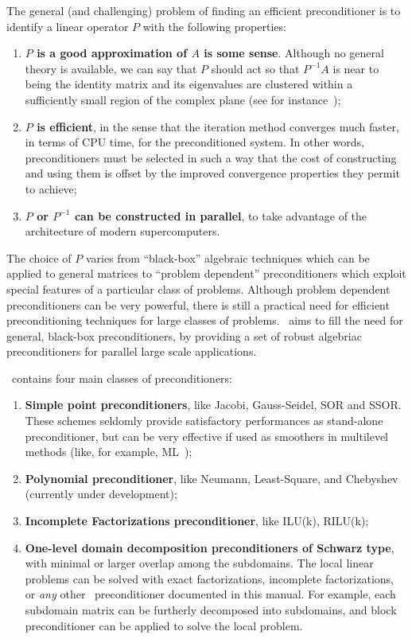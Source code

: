 The general (and challenging) problem of finding an efficient
preconditioner is to identify a linear operator $P$ with the following
properties:
\begin{enumerate}
\item {\bf $P$ is a good approximation of $A$ is some sense}. Although no
  general theory is available, we can say that $P$ should act so that
  $P^{-1} A$ is near to being the identity matrix and its eigenvalues
  are clustered within a sufficiently small region of the complex plane 
  (see for instance~\cite{greenbaum97iterative});
\item {\bf $P$ is efficient}, in the sense that the iteration method converges
  much faster, in terms of CPU time, for the preconditioned system.  In
  other words, preconditioners must be selected in such a way that the
  cost of constructing and using them is offset by the improved
  convergence properties they permit to achieve;
\item {\bf $P$ or $P^{-1}$ can be constructed in parallel}, to take advantage of the architecture of modern supercomputers.
\end{enumerate}

The choice of $P$ varies from ``black-box'' algebraic techniques which
can be applied to general matrices to ``problem dependent''
preconditioners which exploit special features of a particular class
of problems. Although problem dependent preconditioners can be very
powerful, there is still a practical need for efficient
preconditioning techniques for large classes of problems. \ifpack\ aims to
fill the need for general, black-box preconditioners, by providing a set of
robust algebriac preconditioners for parallel large scale applications.

\ifpack\ contains four main classes of preconditioners:
\begin{enumerate}
\item {\bf Simple point preconditioners}, 
  like Jacobi, Gauss-Seidel, SOR and SSOR.
  These schemes seldomly provide satisfactory performances as stand-alone
  preconditioner, but can be very effective if used as smoothers in
  multilevel methods (like, for example, ML~\cite{ml-guide});
\item {\bf Polynomial preconditioner}, like Neumann, Least-Square, and
Chebyshev (currently under development);
\item {\bf Incomplete Factorizations preconditioner}, like ILU(k), RILU(k);
\item {\bf One-level domain decomposition preconditioners of Schwarz type},
  with minimal or larger overlap among the subdomains. The local linear problems
  can be solved with exact factorizations, incomplete factorizations, or
  {\sl any} other \ifpack\ preconditioner documented in this manual. 
  For example, each subdomain matrix
  can be furtherly decomposed into subdomains, and block preconditioner can be
  applied to solve the local problem. 
\end{enumerate}

